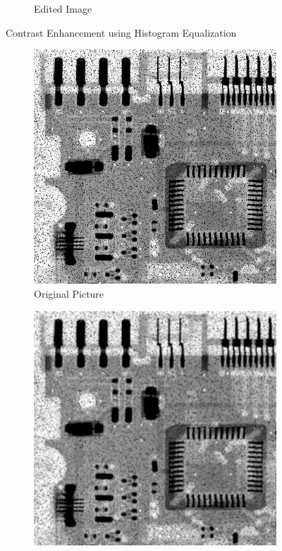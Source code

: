 \documentclass[a4paper]{article}
\begin{document}
\begin{itemize}
\begin{figure}[h!]
\begin{subfigure}[b]{0.3\linewidth}
            \caption{Edited Image}
        \end{subfigure}
        \caption{Contrast Enhancement using Histogram Equalization}
        \label{fig:Histogram Equalization}
    \end{figure}

    \pagebreak
    \begin{figure}[h!]
        \centering
        \begin{subfigure}[b]{0.4\linewidth}
            \centering
            \includegraphics[width=\linewidth]{Pictures/mean, median, mode filter/1.png}
            \caption{Original Picture}
        \end{subfigure}
        \begin{subfigure}[b]{0.4\linewidth}
            \centering
            \includegraphics[width=\linewidth]{Pictures/mean, median, mode filter/mean.png}

\end{subfigure}
\end{figure}
\end{itemize}
\end{document}
